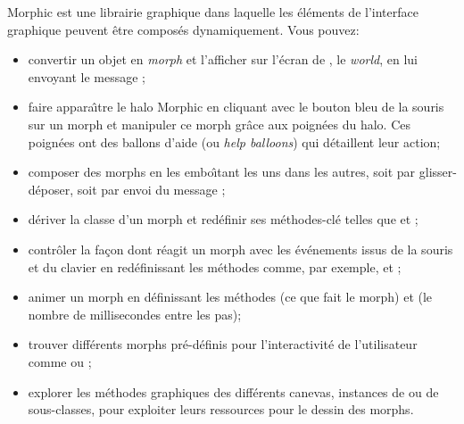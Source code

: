 \documentclass[a4paper,10pt,twoside]{book}
\begin{document}
Morphic est une librairie graphique dans laquelle les \'el\'ements de
l'interface graphique peuvent \^etre compos\'es dynamiquement.
Vous pouvez:
\begin{itemize}
  \item convertir un objet en \emph{morph} et l'afficher
    sur l'\'ecran de \sq, le \emph{world}, en lui envoyant le message
    ;
  \item faire appara\^{\i}tre le halo Morphic en cliquant avec le
    bouton bleu de la souris sur un morph et manipuler ce morph
    gr\^ace aux poign\'ees du halo. Ces poign\'ees ont des ballons
    d'aide (ou \emph{help balloons}) qui d\'etaillent leur action;
  \item composer des morphs en les embo\^{\i}tant les uns dans les autres,
    soit par glisser-d\'eposer, soit par envoi du message ;
  \item d\'eriver la classe d'un morph et red\'efinir ses
    m\'ethodes-cl\'e telles que  et ;
  \item contr\^oler la fa\c{c}on dont r\'eagit un morph avec les
    \'ev\'enements issus de la souris et du clavier en red\'efinissant les
    m\'ethodes comme, par exemple,  et
    ;
  \item animer un morph en d\'efinissant les m\'ethodes 
    (ce que fait le morph) et  (le nombre de
    millisecondes entre les pas);
  \item trouver diff\'erents morphs pr\'e-d\'efinis pour
    l'interactivit\'e de l'utilisateur comme
     ou ;
  \item explorer les m\'ethodes graphiques des diff\'erents canevas,
    instances de  ou de sous-classes,
    pour exploiter leurs ressources pour le dessin des morphs.
\end{itemize}

\ifx\wholebook\relax\else
\end{document}
